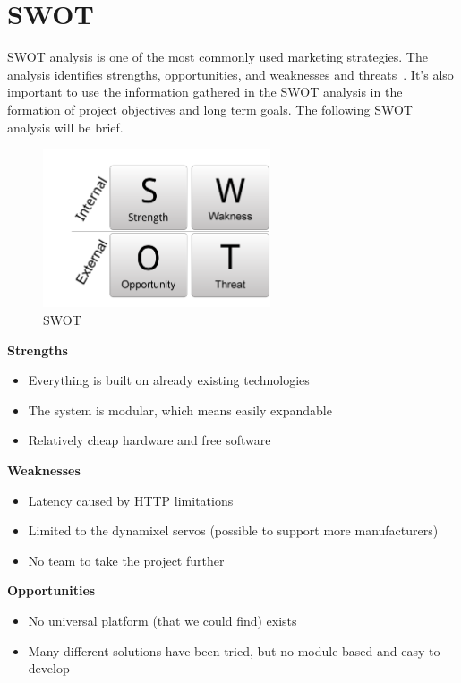 \chapter{SWOT}
SWOT analysis is one of the most commonly used marketing strategies. 
The analysis identifies strengths, opportunities, and weaknesses and threats~\cite{swot-ref}.
It's also important to use the information gathered in the SWOT analysis in the formation of project objectives and long term goals. 
The following SWOT analysis will be brief.
\vspace{\secspace}

\begin{figure}[H]
    \centering
    \includegraphics[width=0.6\textwidth]{graphics/swot.png}	
    \caption{SWOT}
    \label{fig:sw}
\end{figure}

\textbf{\Large Strengths}
\begin{itemize}
	 \item Everything is built on already existing technologies
	 \item The system is modular, which means easily expandable
	 \item Relatively cheap hardware and free software
\end{itemize}

\textbf{\Large Weaknesses}
\begin{itemize}
	 \item Latency caused by HTTP limitations
	 \item Limited to the dynamixel servos (possible to support more manufacturers)
	 \item No team to take the project further
\end{itemize}

\textbf{\Large Opportunities}
\begin{itemize}
	 \item No universal platform (that we could find) exists
	 \item Many different solutions have been tried, but no module based and easy to develop
\end{itemize}

